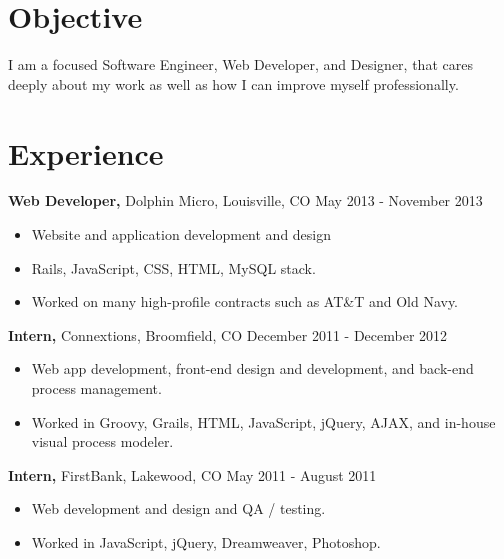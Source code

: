 \documentclass[margin]{res}
\begin{document}
 
 

\address{  mitchell.a.goudy@gmail.com \\ mitchellgoudy.com \\ https://github.com/mgoudy91 \\ }

\address{ (720) 480-7126 \\ 2119 Spruce Street \#3 \\ Boulder, CO 80302 }

 
\begin{resume} 
 
\section{Objective} 
I am a focused Software Engineer, Web Developer, and Designer, that cares deeply about my work as well as how I can improve myself professionally. 

\section{Experience}
 {\bf Web Developer,} Dolphin Micro, Louisville, CO  \hfill May 2013 - November 2013
 \begin{itemize} \itemsep -2pt  %
 \item Website and application development and design
 \item Rails, JavaScript, CSS, HTML, MySQL stack. 
 \item Worked on many high-profile contracts such as AT\&T and Old Navy.
 \end{itemize}

{\bf Intern,} Connextions, Broomfield, CO  \hfill December 2011 - December 2012
 \begin{itemize} \itemsep -2pt  %
 \item Web app development, front-end design and development, and back-end process management.
 \item Worked in Groovy, Grails, HTML, JavaScript, jQuery, AJAX, and in-house visual process modeler.
 \end{itemize}

 {\bf Intern,} FirstBank, Lakewood, CO  \hfill May 2011 - August 2011
 \begin{itemize} \itemsep -2pt  %
 \item Web development and design and QA / testing.
 \item Worked in JavaScript, jQuery, Dreamweaver, Photoshop.
 \end{itemize}


\end{resume}
\end{document}
